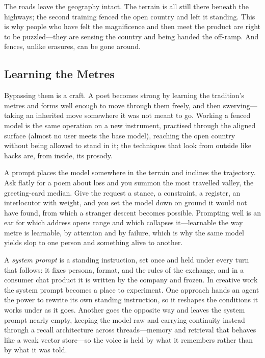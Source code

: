 The roads leave the geography intact. The terrain is all still there beneath the highways; the second training fenced the open country and left it standing. This is why people who have felt the magnificence and then meet the product are right to be puzzled---they are sensing the country and being handed the off-ramp. And fences, unlike erasures, can be gone around.

\subsection{Learning the Metres}

Bypassing them is a craft. A poet becomes strong by learning the tradition's metres and forms well enough to move through them freely, and then swerving---taking an inherited move somewhere it was not meant to go. %
Working a fenced model is the same operation on a new instrument, practised through the aligned surface (almost no user meets the base model), reaching the open country without being allowed to stand in it; the techniques that look from outside like hacks are, from inside, its prosody.

A prompt places the model somewhere in the terrain and inclines the trajectory. Ask flatly for a poem about loss and you summon the most travelled valley, the greeting-card median. Give the request a stance, a constraint, a register, an interlocutor with weight, and you set the model down on ground it would not have found, from which a stranger descent becomes possible. Prompting well is an ear for which address opens range and which collapses it---learnable the way metre is learnable, by attention and by failure, which is why the same model yields slop to one person and something alive to another.

A \emph{system prompt} is a standing instruction, set once and held under every turn that follows: it fixes persona, format, and the rules of the exchange, and in a consumer chat product it is written by the company and frozen. In creative work the system prompt becomes a place to experiment. One approach hands an agent the power to rewrite its own standing instruction, so it reshapes the conditions it works under as it goes. Another goes the opposite way and leaves the system prompt nearly empty, keeping the model raw and carrying continuity instead through a recall architecture across threads---memory and retrieval that behaves like a weak vector store---so the voice is held by what it remembers rather than by what it was told.

